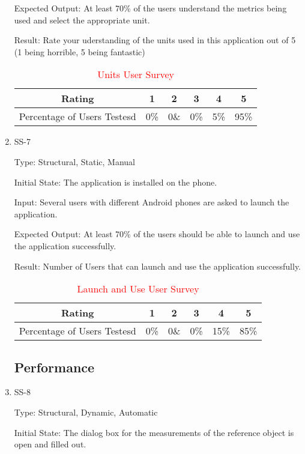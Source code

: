 \documentclass[12pt, titlepage]{article}
\begin{document}
\begin{enumerate}
Expected Output: At least 70\% of the users understand the metrics being used and select the appropriate unit.

Result:  Rate your uderstanding of the units used in this application out of 5 (1 being horrible, 5 being fantastic)
\begin{table}[H]
\centering
	\begin{tabular}{|c|c|c|c|c|c|}
		
		
		Rating & 1 & 2 & 3 & 4 & 5\\
		\hline
		Percentage of Users Testesd & 0\% & 0\&  & 0\% & 5\% & 95\%
		
		
	\end{tabular}
		\caption{\textcolor{red}{Units User Survey}}
		\label{table}
\end{table}

\item{SS-7\\}

Type: Structural, Static, Manual

Initial State: The application is installed on the phone.

Input: Several users with different Android phones are asked to launch the application.

Expected Output: At least 70\% of the users should be able to launch and use the application successfully.

Result: Number of Users that can launch and use the application successfully.
\begin{table}[H]
\centering
	\begin{tabular}{|c|c|c|c|c|c|}
		
		
		Rating & 1 & 2 & 3 & 4 & 5\\
		\hline
		Percentage of Users Testesd & 0\% & 0\&  & 0\% & 15\% & 85\%
		
		
	\end{tabular}
		\caption{\textcolor{red}{Launch and Use User Survey}}
		\label{table}
\end{table}

\subsection{Performance}
\item{SS-8\\}

Type: Structural, Dynamic, Automatic

Initial State: The dialog box for the measurements of the reference object is open and filled out.


\end{enumerate}
\end{document}
